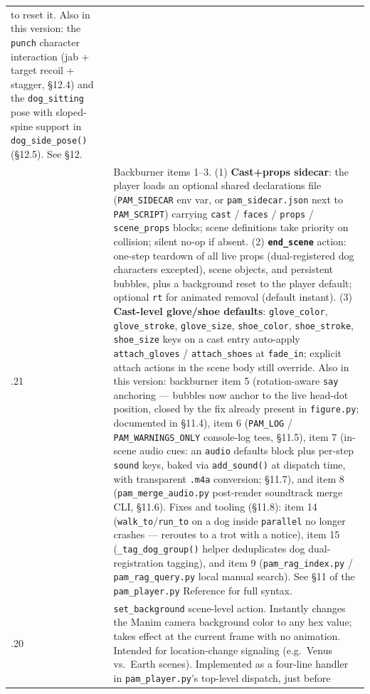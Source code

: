 \documentclass[
  12pt,
  letterpaper,
]{book}
\begin{document}
\begin{longtable}[]{@{}
  >{\raggedright\arraybackslash}p{}
  >{\raggedright\arraybackslash}p{}@{}}
to reset it. Also in this version: the \texttt{punch} character
interaction (jab + target recoil + stagger, §12.4) and the
\texttt{dog\_sitting} pose with sloped-spine support in
\texttt{dog\_side\_pose()} (§12.5). See §12. \\
0.9.21 & Backburner items 1--3. (1) \textbf{Cast+props sidecar}: the
player loads an optional shared declarations file (\texttt{PAM\_SIDECAR}
env var, or \texttt{pam\_sidecar.json} next to \texttt{PAM\_SCRIPT})
carrying \texttt{cast} / \texttt{faces} / \texttt{props} /
\texttt{scene\_props} blocks; scene definitions take priority on
collision; silent no-op if absent. (2) \textbf{\texttt{end\_scene}}
action: one-step teardown of all live props (dual-registered dog
characters excepted), scene objects, and persistent bubbles, plus a
background reset to the player default; optional \texttt{rt} for
animated removal (default instant). (3) \textbf{Cast-level glove/shoe
defaults}: \texttt{glove\_color}, \texttt{glove\_stroke},
\texttt{glove\_size}, \texttt{shoe\_color}, \texttt{shoe\_stroke},
\texttt{shoe\_size} keys on a cast entry auto-apply
\texttt{attach\_gloves} / \texttt{attach\_shoes} at \texttt{fade\_in};
explicit attach actions in the scene body still override. Also in this
version: backburner item 5 (rotation-aware \texttt{say} anchoring ---
bubbles now anchor to the live head-dot position, closed by the fix
already present in \texttt{figure.py}; documented in §11.4), item 6
(\texttt{PAM\_LOG} / \texttt{PAM\_WARNINGS\_ONLY} console-log tees,
§11.5), item 7 (in-scene audio cues: an \texttt{audio} defaults block
plus per-step \texttt{sound} keys, baked via \texttt{add\_sound()} at
dispatch time, with transparent \texttt{.m4a} conversion; §11.7), and
item 8 (\texttt{pam\_merge\_audio.py} post-render
soundtrack merge CLI, §11.6). Fixes and tooling (§11.8): item 14
(\texttt{walk\_to}/\texttt{run\_to} on a dog inside \texttt{parallel}
no longer crashes --- reroutes to a trot with a notice), item 15
(\texttt{\_tag\_dog\_group()} helper deduplicates dog dual-registration
tagging), and item 9 (\texttt{pam\_rag\_index.py} /
\texttt{pam\_rag\_query.py} local manual search). See §11 of
the \texttt{pam\_player.py} Reference for full syntax. \\
0.9.20 & \texttt{set\_background} scene-level action. Instantly changes
the Manim camera background color to any hex value; takes effect at the
current frame with no animation. Intended for location-change signaling
(e.g.\ Venus vs.\ Earth scenes). Implemented as a four-line handler in
\texttt{pam\_player.py}'s top-level dispatch, just before

\end{longtable}
\end{document}
